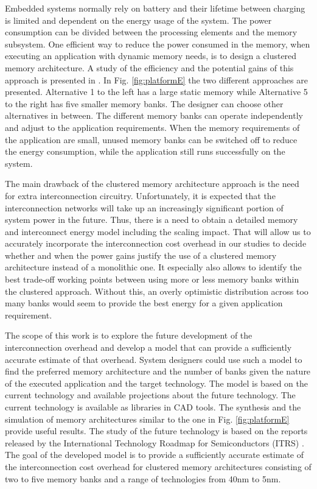 Embedded systems normally rely on battery and their lifetime between charging is limited and dependent on the energy usage of the system.
The power consumption can be divided between the processing elements and the memory subsystem.
One efficient way to reduce the power consumed in the memory, when executing an application with dynamic memory needs, is to design a clustered memory architecture.
A study of the efficiency and the potential gains of this approach is presented in \cite{filippopoulos2013exploration}.
In Fig. \ref{fig:platformE} the two different approaches are presented.
Alternative 1 to the left has a large static memory while Alternative 5 to the right has five smaller memory banks. The designer can choose other alternatives in between.
The different memory banks can operate independently and  adjust to the application requirements.
When the memory requirements of the application are small, unused memory banks can be switched off to reduce the energy consumption, while the application still runs successfully on the system. 
 
 The main drawback of the clustered memory architecture approach is the need for extra interconnection circuitry.
 Unfortunately, it is expected that the interconnection networks will take up an increasingly significant portion of system power in the future. 
Thus, there is a need to obtain a detailed memory and interconnect energy model including the scaling impact. 
That will allow us to accurately incorporate the interconnection cost overhead in our studies to decide whether and when the power gains justify the use of a clustered memory architecture instead of a monolithic one. 
It especially also allows to identify the best trade-off working points between using more
or less memory banks within the clustered approach. 
Without this, an overly optimistic distribution across too many banks would seem to provide the best energy for a given application requirement.
  
  The scope of this work is to explore the future development of the interconnection overhead and develop a model that can provide a sufficiently accurate estimate of that overhead.
  System designers could use such a model to find the preferred memory architecture and the number of banks given the nature of the executed application and the target technology.
  The model is based on the current technology and available projections about the future technology.
  The current technology is available as libraries in CAD tools.
  The synthesis and the simulation of memory architectures similar to the one in Fig. \ref{fig:platformE} provide useful results.
  The study of the future technology is based on the reports released by the International Technology Roadmap for Semiconductors (ITRS) \cite{itrs} .
 The goal of the developed model is to provide a sufficiently accurate estimate of the interconnection cost overhead for clustered memory architectures consisting of two to five memory banks and a range of technologies from 40nm to 5nm.  

